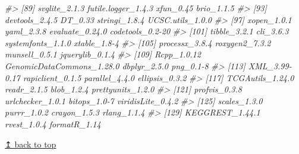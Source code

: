 \documentclass[
]{article}
\newenvironment{Shaded}{\begin{snugshade}}{\end{snugshade}}
\newcommand{\CommentTok}[1]{\textcolor[rgb]{0.56,0.35,0.01}{\textit{#1}}}
\begin{document}
\begin{Shaded}
\begin{Highlighting}[]
\CommentTok{\#\textgreater{}  [89] svglite\_2.1.3             futile.logger\_1.4.3       xfun\_0.45                 brio\_1.1.5               }
\CommentTok{\#\textgreater{}  [93] devtools\_2.4.5            DT\_0.33                   stringi\_1.8.4             UCSC.utils\_1.0.0         }
\CommentTok{\#\textgreater{}  [97] xopen\_1.0.1               yaml\_2.3.8                evaluate\_0.24.0           codetools\_0.2{-}20         }
\CommentTok{\#\textgreater{} [101] tibble\_3.2.1              cli\_3.6.3                 systemfonts\_1.1.0         xtable\_1.8{-}4             }
\CommentTok{\#\textgreater{} [105] processx\_3.8.4            roxygen2\_7.3.2            munsell\_0.5.1             jquerylib\_0.1.4          }
\CommentTok{\#\textgreater{} [109] Rcpp\_1.0.12               GenomicDataCommons\_1.28.0 dbplyr\_2.5.0              png\_0.1{-}8                }
\CommentTok{\#\textgreater{} [113] XML\_3.99{-}0.17             rapiclient\_0.1.5          parallel\_4.4.0            ellipsis\_0.3.2           }
\CommentTok{\#\textgreater{} [117] TCGAutils\_1.24.0          readr\_2.1.5               blob\_1.2.4                prettyunits\_1.2.0        }
\CommentTok{\#\textgreater{} [121] profvis\_0.3.8             urlchecker\_1.0.1          bitops\_1.0{-}7              viridisLite\_0.4.2        }
\CommentTok{\#\textgreater{} [125] scales\_1.3.0              purrr\_1.0.2               crayon\_1.5.3              rlang\_1.1.4              }
\CommentTok{\#\textgreater{} [129] KEGGREST\_1.44.1           rvest\_1.0.4               formatR\_1.14}
\end{Highlighting}
\end{Shaded}

\hyperref[top]{↥ back to top}
\end{document}
